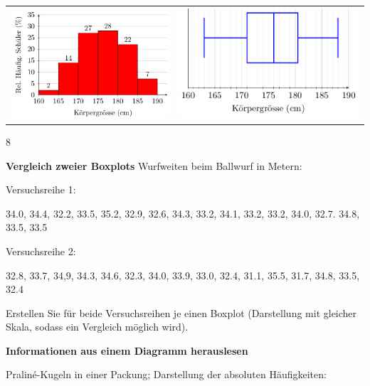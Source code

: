 {\begin{tabular}{cc}
\includegraphics[width=70mm]{img/daan/KoerpergroesseHistogramm.png}
&
\includegraphics[width=80mm]{img/daan/KoerpergroesseBoxplot.png}
\end{tabular}
\newpage
}{8}













\textbf{Vergleich zweier Boxplots}
  Wurfweiten beim Ballwurf in Metern:

  Versuchsreihe 1:

  34.0, 34.4, 32.2, 33.5, 35.2, 32.9, 32.6, 34.3, 33.2, 34.1,
  33.2, 33.2, 34.0, 32.7. 34.8, 33.5, 33.5

  Versuchsreihe 2:

  32.8, 33.7, 34,9, 34.3, 34.6, 32.3, 34.0, 33.9, 33.0, 32.4,
  31.1, 35.5, 31.7, 34.8, 33.5, 32.4

  Erstellen Sie für beide Versuchsreihen je einen Boxplot (Darstellung
  mit gleicher Skala, sodass ein Vergleich möglich wird).
\newpage









\textbf{Informationen aus einem Diagramm herauslesen}

    Praliné-Kugeln in einer Packung; Darstellung der absoluten
    Häufigkeiten:
    
